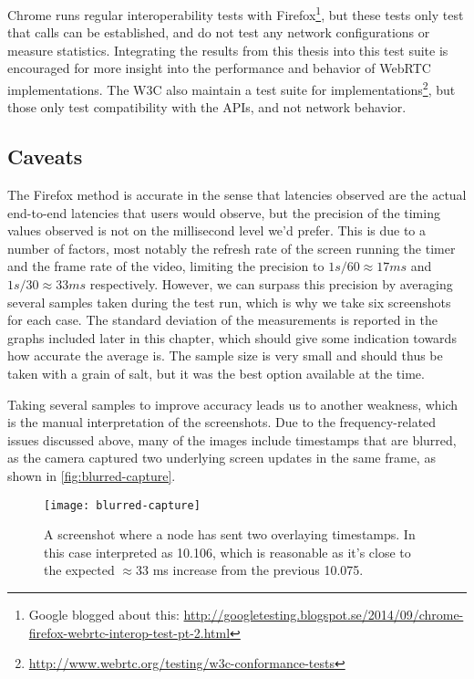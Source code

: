 Chrome runs regular interoperability tests with Firefox\footnote{Google blogged about this: \url{http://googletesting.blogspot.se/2014/09/chrome-firefox-webrtc-interop-test-pt-2.html}}, but these tests only test that calls can be established, and do not test any network configurations or measure statistics. Integrating the results from this thesis into this test suite is encouraged for more insight into the performance and behavior of WebRTC implementations. The W3C also maintain a test suite for implementations\footnote{\url{http://www.webrtc.org/testing/w3c-conformance-tests}}, but those only test compatibility with the APIs, and not network behavior.


\subsection{Caveats}

The Firefox method is accurate in the sense that latencies observed are the actual end-to-end latencies that users would observe, but the precision of the timing values observed is not on the millisecond level we'd prefer. This is due to a number of factors, most notably the refresh rate of the screen running the timer and the frame rate of the video, limiting the precision to $1 s/60\approx17 ms$ and $1 s/30\approx33 ms$ respectively. However, we can surpass this precision by averaging several samples taken during the test run, which is why we take six screenshots for each case. The standard deviation of the measurements is reported in the graphs included later in this chapter, which should give some indication towards how accurate the average is. The sample size is very small and should thus be taken with a grain of salt, but it was the best option available at the time.

Taking several samples to improve accuracy leads us to another weakness, which is the manual interpretation of the screenshots. Due to the frequency-related issues discussed above, many of the images include timestamps that are blurred, as the camera captured two underlying screen updates in the same frame, as shown in \autoref{fig:blurred-capture}.

\begin{figure}
    \centering
    \texttt{[image: blurred-capture]}
    \caption{A screenshot where a node has sent two overlaying timestamps. In this case interpreted as 10.106, which is reasonable as it's close to the expected $\approx$33 ms increase from the previous 10.075.}
    \label{fig:blurred-capture}
\end{figure}

